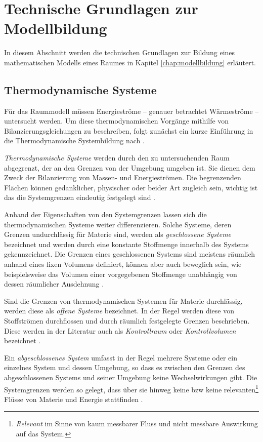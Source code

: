 \section{Technische Grundlagen zur Modellbildung}
\label{sec:grundlagenmodell}
In diesem Abschnitt werden die technischen Grundlagen zur Bildung eines mathematischen Modells eines Raumes in Kapitel \ref{chap:modellbildung} erläutert.

\subsection{Thermodynamische Systeme}

Für das Raummodell müssen Energieströme -- genauer betrachtet Wärmeströme -- untersucht werden. Um diese thermodynamischen Vorgänge mithilfe von Bilanzierungsgleichungen zu beschreiben, folgt zunächst ein kurze Einführung in die Thermodynamische Systembildung nach \cite[S.~11ff.]{ba12}.

\textit{Thermodynamische Systeme} werden durch den zu untersuchenden Raum abgegrenzt, der an den Grenzen von der Umgebung umgeben ist. Sie dienen dem Zweck der Bilanzierung von Massen- und Energieströmen. Die begrenzenden Flächen können gedanklicher, physischer oder beider Art zugleich sein, wichtig ist das die Systemgrenzen eindeutig festgelegt sind \cite[S.~11]{ba12}.

Anhand der Eigenschaften von den Systemgrenzen lassen sich die thermodynamischen Systeme weiter differenzieren.
Solche Systeme, deren Grenzen undurchlässig für Materie sind, werden als \textit{geschlossene Systeme} bezeichnet und werden durch eine konstante Stoffmenge innerhalb des Systems gekennzeichnet. Die Grenzen eines geschlossenen Systems sind meistens räumlich anhand eines fixen Volumens definiert, können aber auch beweglich sein, wie beispielsweise das Volumen einer vorgegebenen Stoffmenge unabhängig von dessen räumlicher Ausdehnung \cite[S.~12]{ba12}.

Sind die Grenzen von thermodynamischen Systemen für Materie durchlässig, werden diese als \textit{offene Systeme} bezeichnet. In der Regel werden diese von Stoffströmen durchflossen und durch räumlich festgelegte Grenzen beschrieben. Diese werden in der Literatur auch als \textit{Kontrollraum} oder \textit{Kontrollvolumen} bezeichnet \cite[S.~12]{ba12}.

Ein \textit{abgeschlossenes System} umfasst in der Regel mehrere Systeme oder ein einzelnes System und dessen Umgebung, so dass es zwischen den Grenzen des abgeschlossenen Systems und seiner Umgebung keine Wechselwirkungen gibt. Die Systemgrenzen werden so gelegt, dass über sie hinweg keine \acrlong{bzw} keine relevanten\footnote{\textit{Relevant} im Sinne von kaum messbarer Fluss und nicht messbare Auswirkung auf das System.} Flüsse von Materie und Energie stattfinden \cite[S.~13]{ba12}.

